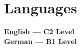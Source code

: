 \documentclass[a4,11pt]{article}
\makeatletter
\newcommand{\resumeItem}[1]{
  \item\small{
    {#1 \vspace*{4pt}}
  }
}
\newcommand{\resumeProjectHeading}[2]{
    \item
    \begin{tabular*}{0.97\textwidth}{l@{\extracolsep{\fill}}r}
      \normalsize#1 & #2 \\
    \end{tabular*}\vspace*{-1pt}
}
\newcommand{\resumeSubHeadingListStart}{\begin{itemize}[leftmargin=0.15in, label={}]}
\newcommand{\resumeSubHeadingListEnd}{\end{itemize}}
\newcommand{\resumeItemListStart}{\begin{itemize}}
\newcommand{\resumeItemListEnd}{\end{itemize}\vspace*{-1pt}}
\makeatother
\begin{document}

%

\section{Languages}
 \begin{itemize}[leftmargin=0.15in, label={}]
    \small{\item{
          \textbf{English --- C2 Level } \vspace*{4pt} \\
          \textbf{German --- B1 Level } \vspace*{4pt} \\ 
    }}
 \end{itemize}

\end{document}
